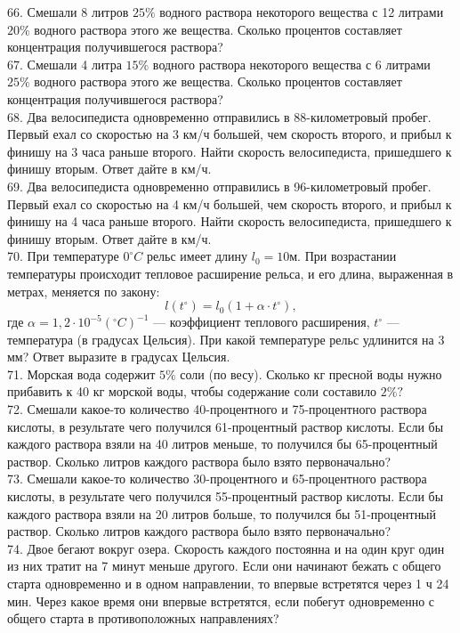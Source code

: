 \documentclass[12pt]{article}
\begin{document}
66. Смешали 8 литров $25\%$ водного раствора некоторого вещества с 12 литрами $20\%$ водного раствора этого же вещества. Сколько процентов составляет концентрация получившегося раствора?\\
67. Смешали 4 литра $15\%$ водного раствора некоторого вещества с 6 литрами $25\%$ водного раствора этого же вещества. Сколько процентов составляет концентрация получившегося раствора?\\
68. Два велосипедиста одновременно отправились в 88-километровый пробег. Первый ехал со скоростью на 3 км/ч большей, чем скорость второго, и прибыл к финишу на 3 часа раньше второго. Найти скорость велосипедиста, пришедшего к финишу вторым. Ответ дайте в км/ч.\\
69. Два велосипедиста одновременно отправились в 96-километровый пробег. Первый ехал со скоростью на 4 км/ч большей, чем скорость второго, и прибыл к финишу на 4 часа раньше второго. Найти скорость велосипедиста, пришедшего к финишу вторым. Ответ дайте в км/ч.\\
70. При температуре $0^\circ C$ рельс имеет длину $l_0=10$м. При возрастании температуры происходит тепловое расширение рельса, и его длина, выраженная в метрах, меняется по закону:
$$l(t^\circ)=l_0(1+\alpha\cdot t^\circ),$$
где $\alpha=1,2\cdot10^{-5}(^\circ C)^{-1}$ --- коэффициент теплового расширения, $t^\circ$ --- температура (в градусах Цельсия). При какой температуре рельс удлинится на 3 мм? Ответ выразите в градусах Цельсия.\\
71. Морская вода содержит $5\%$ соли (по весу). Сколько кг пресной воды нужно прибавить к 40 кг морской воды, чтобы содержание соли составило $2\%?$\\
72. Смешали какое-то количество 40-процентного и 75-процентного раствора кислоты, в результате чего получился 61-процентный раствор кислоты. Если бы каждого раствора взяли на 40 литров меньше, то получился бы 65-процентный раствор. Сколько литров каждого раствора было взято первоначально?\\
73. Смешали какое-то количество 30-процентного и 65-процентного раствора кислоты, в результате чего получился 55-процентный раствор кислоты. Если бы каждого раствора взяли на 20 литров больше, то получился бы 51-процентный раствор. Сколько литров каждого раствора было взято первоначально?\\
74. Двое бегают вокруг озера. Скорость каждого постоянна и на один круг один из них тратит на 7 минут меньше другого. Если они начинают бежать с общего старта одновременно и в одном направлении, то впервые встретятся через 1 ч 24 мин. Через какое время они впервые встретятся, если побегут одновременно с общего старта в противоположных направлениях?\\
\end{document}
